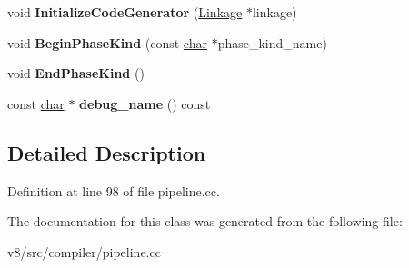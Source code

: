\begin{DoxyCompactItemize}
\mbox{\label{classv8_1_1internal_1_1compiler_1_1PipelineData_ae319150dfa40d8801c81b7601d31a165}} 
void {\bfseries Initialize\+Code\+Generator} (\mbox{\hyperlink{classv8_1_1internal_1_1compiler_1_1Linkage}{Linkage}} $\ast$linkage)
\item 
\mbox{\label{classv8_1_1internal_1_1compiler_1_1PipelineData_a6be39334fac07daf70b50441d226e01f}} 
void {\bfseries Begin\+Phase\+Kind} (const \mbox{\hyperlink{classchar}{char}} $\ast$phase\+\_\+kind\+\_\+name)
\item 
\mbox{\label{classv8_1_1internal_1_1compiler_1_1PipelineData_a58cc6f9b8e537fbd37b97d5384292e5f}} 
void {\bfseries End\+Phase\+Kind} ()
\item 
\mbox{\label{classv8_1_1internal_1_1compiler_1_1PipelineData_aa05387e8827520e0bc111387cd18d41a}} 
const \mbox{\hyperlink{classchar}{char}} $\ast$ {\bfseries debug\+\_\+name} () const
\end{DoxyCompactItemize}


\subsection{Detailed Description}


Definition at line 98 of file pipeline.\+cc.



The documentation for this class was generated from the following file\+:\begin{DoxyCompactItemize}
\item 
v8/src/compiler/pipeline.\+cc\end{DoxyCompactItemize}

